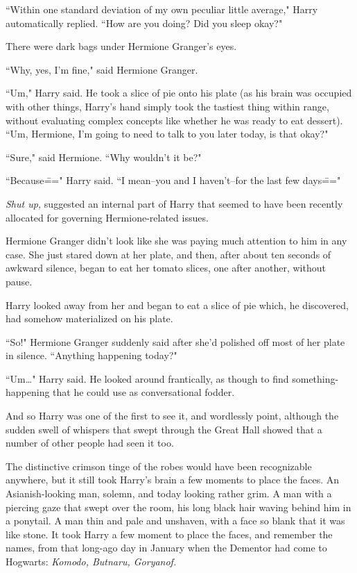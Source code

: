 ``Within one standard deviation of my own peculiar little average," Harry automatically replied. ``How are you doing? Did you sleep okay?"

There were dark bags under Hermione Granger's eyes.

``Why, yes, I'm fine," said Hermione Granger.

``Um," Harry said. He took a slice of pie onto his plate (as his brain was occupied with other things, Harry's hand simply took the tastiest thing within range, without evaluating complex concepts like whether he was ready to eat dessert). ``Um, Hermione, I'm going to need to talk to you later today, is that okay?"

``Sure," said Hermione. ``Why wouldn't it be?"

``Because\===" Harry said. ``I mean\---you and I haven't\---for the last few days\==="

\emph{Shut up,} suggested an internal part of Harry that seemed to have been recently allocated for governing Hermione-related issues.

Hermione Granger didn't look like she was paying much attention to him in any case. She just stared down at her plate, and then, after about ten seconds of awkward silence, began to eat her tomato slices, one after another, without pause.

Harry looked away from her and began to eat a slice of pie which, he discovered, had somehow materialized on his plate.

``So!" Hermione Granger suddenly said after she'd polished off most of her plate in silence. ``Anything happening today?"

``Um{\ldots}" Harry said. He looked around frantically, as though to find something-happening that he could use as conversational fodder.

And so Harry was one of the first to see it, and wordlessly point, although the sudden swell of whispers that swept through the Great Hall showed that a number of other people had seen it too.

The distinctive crimson tinge of the robes would have been recognizable anywhere, but it still took Harry's brain a few moments to place the faces. An Asianish-looking man, solemn, and today looking rather grim. A man with a piercing gaze that swept over the room, his long black hair waving behind him in a ponytail. A man thin and pale and unshaven, with a face so blank that it was like stone. It took Harry a few moment to place the faces, and remember the names, from that long-ago day in January when the Dementor had come to Hogwarts: \emph{Komodo, Butnaru, Goryanof.}

